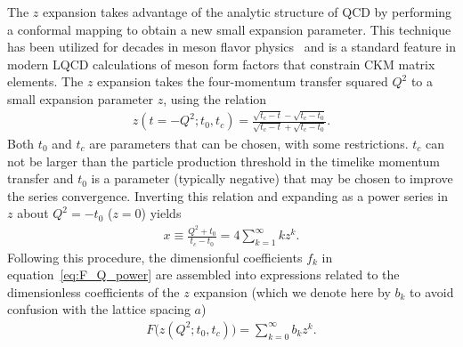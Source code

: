 \documentclass{ar-1col}
\begin{document}
The $z$ expansion takes advantage of the analytic structure of QCD
 by performing a conformal mapping to obtain a new small expansion parameter. This technique has been utilized for decades in meson flavor physics~\cite{Okubo:1971jf}
and is a standard feature in modern LQCD calculations of meson form factors
that constrain CKM matrix elements.
The $z$ expansion takes the four-momentum transfer squared $Q^2$
 to a small expansion parameter $z$, using the relation
\begin{align}
 z(t=-Q^2;t_0,t_c) = \frac{\sqrt{t_c-t} -\sqrt{t_c-t_0}}{ \sqrt{t_c-t} +\sqrt{t_c-t_0}}.
\end{align}
Both $t_0$ and $t_c$ are parameters that can be chosen, with some restrictions.
$t_c$ can not be larger than the particle production threshold in the timelike momentum transfer
 and $t_0$ is a parameter (typically negative) that
 may be chosen to improve the series convergence.
Inverting this relation and expanding as a power series in $z$ about $Q^2=-t_0$ ($z=0$) yields
\begin{align}
x \equiv  \frac{Q^2+t_0}{t_c-t_0} = 4 \sum_{k=1}^\infty k z^k.
 \label{eq:Q2toz}
\end{align}
Following this procedure, the dimensionful coefficients $f_k$ in equation~\eqref{eq:F_Q_power} are assembled into expressions related to the dimensionless coefficients of the $z$ expansion (which we denote here by $b_k$ to avoid confusion with the lattice spacing $a$)
\begin{align}
 F\big(z(Q^2; t_0, t_c)\big) = \sum_{k=0}^\infty b_k z^k.
 \label{eq:zexp}
\end{align}
\end{document}
